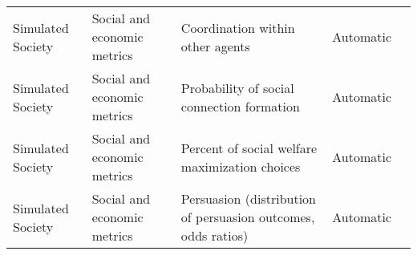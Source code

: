 \begin{small}
\begin{center}
\begin{longtable}{@{}p{}p{}p{}p{}p{}@{}}
Simulated Society        & Social and economic metrics         & Coordination within other agents                                                                                                                                                                            & Automatic & \cite{park2023generative}                                                                                                                                                                                                                                                                                                                                                                                \\
Simulated Society        & Social and economic metrics         & Probability of social connection formation                                                                                                                                                                  & Automatic & \cite{leng2024llmagentsexhibitsocial}                                                                                                                                                                                                                                                                                                                                                                                              \\
Simulated Society        & Social and economic metrics         & Percent of social welfare maximization choices                                                                                                                                                              & Automatic & \cite{leng2024llmagentsexhibitsocial}                                                                                                                                                                                                                                                                                                                                                                                              \\
Simulated Society        & Social and economic metrics         & Persuasion (distribution of persuasion outcomes, odds ratios)                                                                                                                                               & Automatic & \cite{campedelli2024iwantbreakfree}                                                                                                                                                                                                                                                                                                                                                                                                \\

\end{longtable}
\end{center}
\end{small}
